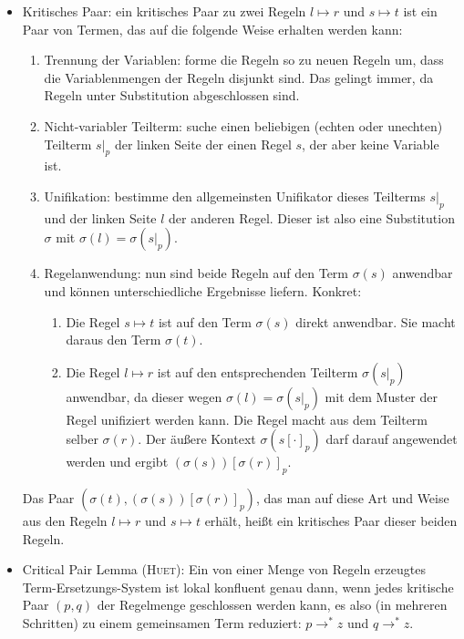 \documentclass[
  a4paper,
  11pt,
]{scrartcl}
\begin{document}
\begin{itemize}
  \item Kritisches Paar: ein kritisches Paar zu zwei Regeln $l \mapsto r$ und $s
    \mapsto t$ ist ein Paar von Termen, das auf die folgende Weise erhalten
    werden kann:
    \begin{enumerate}
      \item Trennung der Variablen: forme die Regeln so zu neuen Regeln um, dass
        die Variablenmengen der Regeln disjunkt sind. Das gelingt immer, da
        Regeln unter Substitution abgeschlossen sind.

      \item Nicht-variabler Teilterm: suche einen beliebigen (echten oder
        unechten) Teilterm ${s|}_p$ der linken Seite der einen Regel $s$, der
        aber keine Variable ist.

      \item Unifikation: bestimme den allgemeinsten Unifikator dieses Teilterms
        ${s|}_p$ und der linken Seite $l$ der anderen Regel. Dieser ist also
        eine Substitution $\sigma$ mit $\sigma(l) = \sigma({s|}_p)$.

      \item Regelanwendung: nun sind beide Regeln auf den Term $\sigma(s)$
        anwendbar und können unterschiedliche Ergebnisse liefern. Konkret:
        \begin{enumerate}
          \item Die Regel $s \mapsto t$ ist auf den Term $\sigma(s)$ direkt
            anwendbar. Sie macht daraus den Term $\sigma(t)$.

          \item Die Regel $l \mapsto r$ ist auf den entsprechenden Teilterm
            $\sigma({s|}_p)$ anwendbar, da dieser wegen $\sigma(l) =
            \sigma({s|}_p)$ mit dem Muster der Regel unifiziert werden kann. Die
            Regel macht aus dem Teilterm selber $\sigma(r)$. Der äußere Kontext
            $\sigma({s[\cdot]}_p)$ darf darauf angewendet werden und ergibt
            $(\sigma(s)){[\sigma(r)]}_p$.
        \end{enumerate}
    \end{enumerate}

    Das Paar $(\sigma(t), (\sigma(s)){[\sigma(r)]}_p)$, das man auf diese Art
    und Weise aus den Regeln $l \mapsto r$ und $s \mapsto t$ erhält, heißt ein
    kritisches Paar dieser beiden Regeln.

  \item Critical Pair Lemma (\textsc{Huet}): Ein von einer Menge von Regeln
    erzeugtes Term-Ersetzungs-System ist lokal konfluent genau dann, wenn jedes
    kritische Paar $(p, q)$ der Regelmenge geschlossen werden kann, es also (in
    mehreren Schritten) zu einem gemeinsamen Term reduziert: $p \rightarrow^* z$
    und $q \rightarrow^* z$.


\end{itemize}
\end{document}
